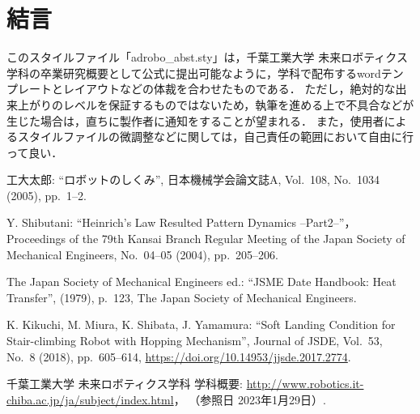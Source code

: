 \documentclass[10pt]{jarticle}
\begin{document}
    \section{結\hspace{2zw}言}%
    このスタイルファイル「adrobo\_abst.sty」は，千葉工業大学 未来ロボティクス学科の卒業研究概要として公式に提出可能なように，学科で配布するwordテンプレートとレイアウトなどの体裁を合わせたものである．
    ただし，絶対的な出来上がりのレベルを保証するものではないため，執筆を進める上で不具合などが生じた場合は，直ちに製作者に通知をすることが望まれる．
    また，使用者によるスタイルファイルの微調整などに関しては，自己責任の範囲において自由に行って良い．
    
    \vspace{5truemm}
    {\footnotesize
        \begin{thebibliography}{99}
            
            工大太郎: ``ロボットのしくみ'', 
            日本機械学会論文誌A, 
            Vol.~108, No.~1034 (2005), pp.~1--2.
            
            Y. Shibutani: ``Heinrich's Law Resulted Pattern Dynamics --Part2--''，
            Proceedings of the 79th Kansai Branch Regular Meeting of the Japan Society of Mechanical Engineers,  
            No.~04--05 (2004), pp.~205--206.
            
            The Japan Society of Mechanical Engineers ed.: ``JSME Date Handbook: Heat Transfer'', 
            (1979), p.~123, The Japan Society of Mechanical Engineers.
            
            K. Kikuchi, M. Miura, K. Shibata, J. Yamamura: ``Soft Landing Condition for Stair-climbing Robot with Hopping Mechanism'', 
            Journal of JSDE, Vol.~53, No.~8 (2018), pp.~605--614, \url{https://doi.org/10.14953/jjsde.2017.2774}.
            
            千葉工業大学 未来ロボティクス学科 学科概要: 
            \url{http://www.robotics.it-chiba.ac.jp/ja/subject/index.html}， 
            （参照日 2023年1月29日）. 
            
        \end{thebibliography}
    }
    \normalsize
    
\end{document}

